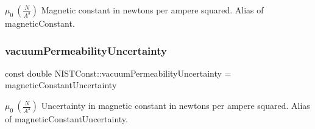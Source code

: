 $\mu_0 \ (\frac{N}{A^3})$ Magnetic constant in newtons per ampere squared. Alias of magnetic\+Constant. \mbox{\label{group___magnetic_constant_gaf9ad0468a42a06fab2ba9738f20aa68b}} 
\subsubsection{\texorpdfstring{vacuum\+Permeability\+Uncertainty}{vacuumPermeabilityUncertainty}}
{\footnotesize\ttfamily const double N\+I\+S\+T\+Const\+::vacuum\+Permeability\+Uncertainty = magnetic\+Constant\+Uncertainty}

$\mu_0 \ (\frac{N}{A^3})$ Uncertainty in magnetic constant in newtons per ampere squared. Alias of magnetic\+Constant\+Uncertainty. 